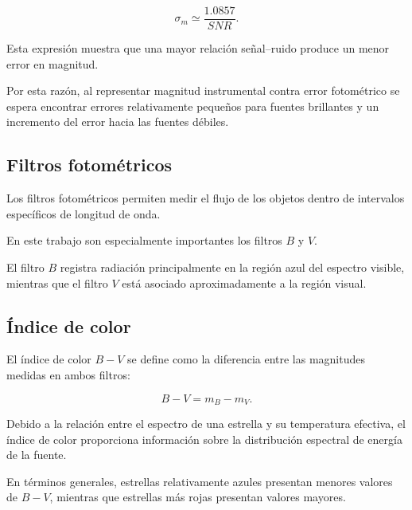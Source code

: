 \documentclass[12pt,letterpaper,oneside]{book}
\begin{document}
\begin{equation}
\sigma_m
\simeq
\frac{1.0857}{SNR}.
\end{equation}

Esta expresión muestra que una mayor relación señal--ruido produce un menor error en magnitud.

Por esta razón, al representar magnitud instrumental contra error fotométrico se espera encontrar errores relativamente pequeños para fuentes brillantes y un incremento del error hacia las fuentes débiles.



\subsection{Filtros fotométricos}

Los filtros fotométricos permiten medir el flujo de los objetos dentro de intervalos específicos de longitud de onda.

En este trabajo son especialmente importantes los filtros $B$ y $V$.

El filtro $B$ registra radiación principalmente en la región azul del espectro visible, mientras que el filtro $V$ está asociado aproximadamente a la región visual.



\subsection{Índice de color}

El índice de color $B-V$ se define como la diferencia entre las magnitudes medidas en ambos filtros:

\begin{equation}
B-V
=
m_B-m_V.
\end{equation}

Debido a la relación entre el espectro de una estrella y su temperatura efectiva, el índice de color proporciona información sobre la distribución espectral de energía de la fuente.

En términos generales, estrellas relativamente azules presentan menores valores de $B-V$, mientras que estrellas más rojas presentan valores mayores.


\end{document}
